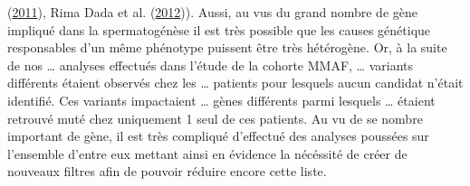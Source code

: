 \documentclass[12pt,twoside]{reedthesis}
\theoremstyle{definition}
\theoremstyle{definition}
\theoremstyle{remark}
\begin{document}
  (\protect\hyperlink{ref-Dada2011}{2011}), Rima Dada et al.
  (\protect\hyperlink{ref-Dada2012}{2012})). Aussi, au vus du grand nombre
  de gène impliqué dans la spermatogénèse il est très possible que les
  causes génétique responsables d'un même phénotype puissent être très
  hétérogène. Or, à la suite de nos \ldots{} analyses effectués dans
  l'étude de la cohorte MMAF, \ldots{} variants différents étaient
  observés chez les \ldots{} patients pour lesquels aucun candidat n'était
  identifié. Ces variants impactaient \ldots{} gènes différents parmi
  lesquels \ldots{} étaient retrouvé muté chez uniquement 1 seul de ces
  patients. Au vu de se nombre important de gène, il est très compliqué
  d'effectué des analyses poussées sur l'ensemble d'entre eux mettant
  ainsi en évidence la nécéssité de créer de nouveaux filtres afin de
  pouvoir réduire encore cette liste.
  
\end{document}
